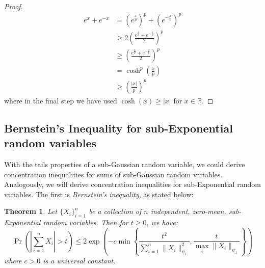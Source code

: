 \documentclass{article}
\newtheorem{theorem}{Theorem}[subsection]
\theoremstyle{remark}
\newcommand{\real}{\mathbb{R}}
\begin{document}
\begin{proof}
\begin{align*}
e^{x} + e^{-x} &= \left(e^{\frac{x}{p}}\right)^{p} + \left(e^{-\frac{x}{p}}\right)^{p} \\
&\geq 2\left(\frac{e^{\frac{x}{p}} + e^{-\frac{x}{p}}}{2}\right)^{p} \\
&\geq \left(\frac{e^{\frac{x}{p}} + e^{-\frac{x}{p}}}{2}\right)^{p} \\
&= \cosh^{p}\left(\frac{x}{p}\right) \\
&\geq \left(\frac{|x|}{p}\right)^{p}
\end{align*}
where in the final step we have used \(\cosh(x) \geq |x|\) for \(x \in \real\).
\end{proof}

\subsection{Bernstein's Inequality for sub-Exponential random variables}
With the tails properties of a sub-Gaussian random variable, we could derive concentration inequalities for sums of sub-Gaussian random variables. Analogously, we will derive concentration inequalities for sub-Exponential random variables. The first is \emph{Bernstein's inequality}, as stated below:

\begin{theorem}
\label{thm:bernstein-sub-exp}
Let \(\{X_{i}\}_{i=1}^{n}\) be a collection of \(n\) independent, zero-mean, sub-Exponential random variables. Then for \(t \geq 0\), we have:
\begin{equation*}
\Pr\left(\left|\sum_{i=1}^{n}X_{i}\right| > t\right) \leq 2\exp\left(-c \min\left\{\frac{t^{2}}{\sum\limits_{i=1}^{n}\|X_{i}\|_{\psi_{1}}^{2}}, \frac{t}{\max\limits_{i} \|X_{i}\|_{\psi_{1}}}\right\}\right)
\end{equation*}
where \(c > 0\) is a universal constant.
\end{theorem}
\end{document}
